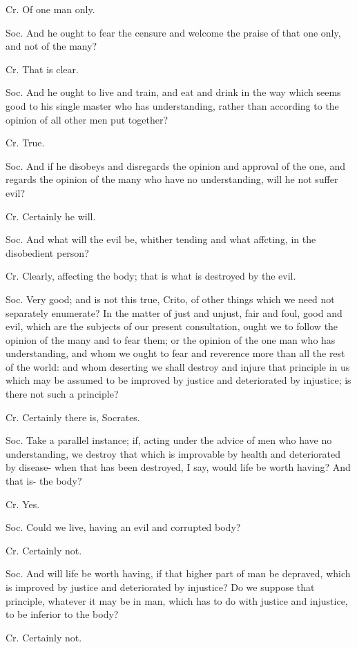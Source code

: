 Cr. Of one man only. 

Soc. And he ought to fear the censure and welcome the praise of that
one only, and not of the many? 

Cr. That is clear. 

Soc. And he ought to live and train, and eat and drink in the way
which seems good to his single master who has understanding, rather
than according to the opinion of all other men put together?

Cr. True. 

Soc. And if he disobeys and disregards the opinion and approval of
the one, and regards the opinion of the many who have no understanding,
will he not suffer evil? 

Cr. Certainly he will. 

Soc. And what will the evil be, whither tending and what affcting,
in the disobedient person? 

Cr. Clearly, affecting the body; that is what is destroyed by the
evil. 

Soc. Very good; and is not this true, Crito, of other things which
we need not separately enumerate? In the matter of just and unjust,
fair and foul, good and evil, which are the subjects of our present
consultation, ought we to follow the opinion of the many and to fear
them; or the opinion of the one man who has understanding, and whom
we ought to fear and reverence more than all the rest of the world:
and whom deserting we shall destroy and injure that principle in us
which may be assumed to be improved by justice and deteriorated by
injustice; is there not such a principle? 

Cr. Certainly there is, Socrates. 

Soc. Take a parallel instance; if, acting under the advice of men
who have no understanding, we destroy that which is improvable by
health and deteriorated by disease- when that has been destroyed,
I say, would life be worth having? And that is- the body?

Cr. Yes. 

Soc. Could we live, having an evil and corrupted body? 

Cr. Certainly not. 

Soc. And will life be worth having, if that higher part of man be
depraved, which is improved by justice and deteriorated by injustice?
Do we suppose that principle, whatever it may be in man, which has
to do with justice and injustice, to be inferior to the body?

Cr. Certainly not. 

